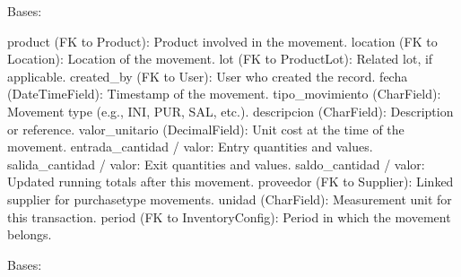 \documentclass[a4paper,11pt,spanish]{sphinxmanual}
\begin{document}

\begin{fulllineitems}
\label{\detokenize{api/inventory/inventory.models:inventory.models.InventoryMovement}}
\pysigstartsignatures
\pysiglinewithargsret
{}
{\sphinxparamcomma {}}
{}
\pysigstopsignatures
\sphinxAtStartPar
Bases: 
\begin{description}
\sphinxAtStartPar
product (FK to Product): Product involved in the movement.
location (FK to Location): Location of the movement.
lot (FK to ProductLot): Related lot, if applicable.
created\_by (FK to User): User who created the record.
fecha (DateTimeField): Timestamp of the movement.
tipo\_movimiento (CharField): Movement type (e.g., INI, PUR, SAL, etc.).
descripcion (CharField): Description or reference.
valor\_unitario (DecimalField): Unit cost at the time of the movement.
entrada\_cantidad / valor: Entry quantities and values.
salida\_cantidad / valor: Exit quantities and values.
saldo\_cantidad / valor: Updated running totals after this movement.
proveedor (FK to Supplier): Linked supplier for purchase\sphinxhyphen{}type movements.
unidad (CharField): Measurement unit for this transaction.
period (FK to InventoryConfig): Period in which the movement belongs.

\end{description}

\begin{fulllineitems}
\label{\detokenize{api/inventory/inventory.models:inventory.models.InventoryMovement.DoesNotExist}}
\pysigstartsignatures
\pysigline
{}
\pysigstopsignatures
\sphinxAtStartPar
Bases: 

\end{fulllineitems}



\end{fulllineitems}
\end{document}
